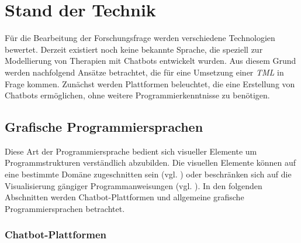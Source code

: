 
\section{Stand der Technik}
\label{ch:Forschungsstand}
Für die Bearbeitung der Forschungsfrage werden verschiedene Technologien bewertet.  Derzeit existiert noch keine bekannte Sprache, die speziell zur Modellierung von Therapien mit Chatbots entwickelt wurden. Aus diesem Grund werden nachfolgend Ansätze betrachtet, die für eine Umsetzung einer \emph{TML} in Frage kommen. Zunächst werden Plattformen beleuchtet, die eine Erstellung von Chatbots ermöglichen, ohne weitere Programmierkenntnisse zu benötigen. 

\subsection{Grafische Programmiersprachen}
Diese Art der Programmiersprache bedient sich visueller Elemente um Programmstrukturen verständlich abzubilden. Die visuellen Elemente können auf eine bestimmte Domäne zugeschnitten sein (vgl. \cite{WasistLa94:online}) oder beschränken sich auf die Visualisierung gängiger Programmanweisungen (vgl. \cite{BlocklyG57:online}). In den folgenden Abschnitten werden Chatbot-Plattformen und allgemeine grafische Programmiersprachen betrachtet.

\subsubsection{Chatbot-Plattformen}

